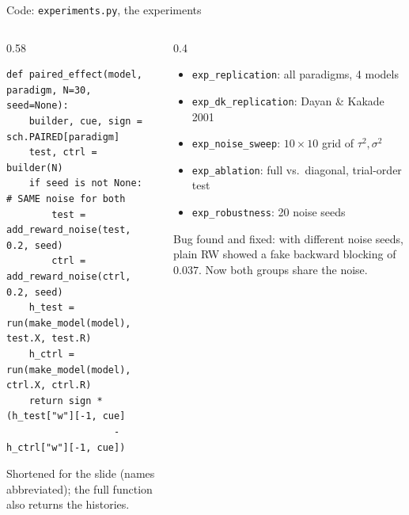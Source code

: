 \documentclass[aspectratio=169,11pt]{beamer}
\begin{document}
\begin{frame}[fragile]{Code: \texttt{experiments.py}, the experiments}
\begin{columns}[T]
\begin{column}{0.58\textwidth}
\begin{lstlisting}
def paired_effect(model, paradigm, N=30, seed=None):
    builder, cue, sign = sch.PAIRED[paradigm]
    test, ctrl = builder(N)
    if seed is not None:        # SAME noise for both
        test = add_reward_noise(test, 0.2, seed)
        ctrl = add_reward_noise(ctrl, 0.2, seed)
    h_test = run(make_model(model), test.X, test.R)
    h_ctrl = run(make_model(model), ctrl.X, ctrl.R)
    return sign * (h_test["w"][-1, cue]
                   - h_ctrl["w"][-1, cue])
\end{lstlisting}
{\tiny Shortened for the slide (names abbreviated); the full function also returns the histories.}
\end{column}
\begin{column}{0.4\textwidth}
\footnotesize
\begin{itemize}
\item \texttt{exp\_replication}: all paradigms, 4 models
\item \texttt{exp\_dk\_replication}: Dayan \& Kakade 2001
\item \texttt{exp\_noise\_sweep}: $10\times10$ grid of $\tau^2, \sigma^2$
\item \texttt{exp\_ablation}: full vs.\ diagonal, trial-order test
\item \texttt{exp\_robustness}: 20 noise seeds
\end{itemize}
\vspace{0.3em}
\alert{Bug found and fixed:} with different noise seeds, plain RW showed a fake backward blocking of $0.037$. Now both groups share the noise.
\end{column}
\end{columns}
\end{frame}
\end{document}
